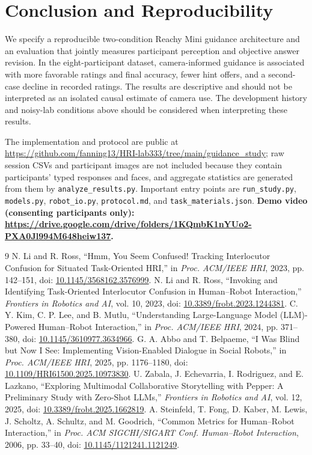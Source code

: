 \documentclass[conference]{IEEEtran}
\begin{document}
\section{Conclusion and Reproducibility}
We specify a reproducible two-condition Reachy Mini guidance architecture and an evaluation that jointly measures participant perception and objective answer revision. In the eight-participant dataset, camera-informed guidance is associated with more favorable ratings and final accuracy, fewer hint offers, and a second-case decline in recorded ratings. The results are descriptive and should not be interpreted as an isolated causal estimate of camera use. The development history and noisy-lab conditions above should be considered when interpreting these results.

The implementation and protocol are public at \url{https://github.com/fanning13/HRI-lab333/tree/main/guidance_study}; raw session CSVs and participant images are not included because they contain participants' typed responses and faces, and aggregate statistics are generated from them by \texttt{analyze\_results.py}. Important entry points are \texttt{run\_study.py}, \texttt{models.py}, \texttt{robot\_io.py}, \texttt{protocol.md}, and \texttt{task\_materials.json}.  \textbf{Demo video (consenting participants only): \url{https://drive.google.com/drive/folders/1KQmbK1nYUo2-PXA0Jl994M648heiw137}.}

\begin{thebibliography}{9}
 N. Li and R. Ross, ``Hmm, You Seem Confused! Tracking Interlocutor Confusion for Situated Task-Oriented HRI,'' in \emph{Proc. ACM/IEEE HRI}, 2023, pp. 142--151, doi: \href{https://doi.org/10.1145/3568162.3576999}{10.1145/3568162.3576999}.
 N. Li and R. Ross, ``Invoking and Identifying Task-Oriented Interlocutor Confusion in Human--Robot Interaction,'' \emph{Frontiers in Robotics and AI}, vol. 10, 2023, doi: \href{https://doi.org/10.3389/frobt.2023.1244381}{10.3389/frobt.2023.1244381}.
 C. Y. Kim, C. P. Lee, and B. Mutlu, ``Understanding Large-Language Model (LLM)-Powered Human--Robot Interaction,'' in \emph{Proc. ACM/IEEE HRI}, 2024, pp. 371--380, doi: \href{https://doi.org/10.1145/3610977.3634966}{10.1145/3610977.3634966}.
 G. A. Abbo and T. Belpaeme, ``I Was Blind but Now I See: Implementing Vision-Enabled Dialogue in Social Robots,'' in \emph{Proc. ACM/IEEE HRI}, 2025, pp. 1176--1180, doi: \href{https://doi.org/10.1109/HRI61500.2025.10973830}{10.1109/HRI61500.2025.10973830}.
 U. Zabala, J. Echevarria, I. Rodriguez, and E. Lazkano, ``Exploring Multimodal Collaborative Storytelling with Pepper: A Preliminary Study with Zero-Shot LLMs,'' \emph{Frontiers in Robotics and AI}, vol. 12, 2025, doi: \href{https://doi.org/10.3389/frobt.2025.1662819}{10.3389/frobt.2025.1662819}.
 A. Steinfeld, T. Fong, D. Kaber, M. Lewis, J. Scholtz, A. Schultz, and M. Goodrich, ``Common Metrics for Human--Robot Interaction,'' in \emph{Proc. ACM SIGCHI/SIGART Conf. Human--Robot Interaction}, 2006, pp. 33--40, doi: \href{https://doi.org/10.1145/1121241.1121249}{10.1145/1121241.1121249}.
\end{thebibliography}
\end{document}
